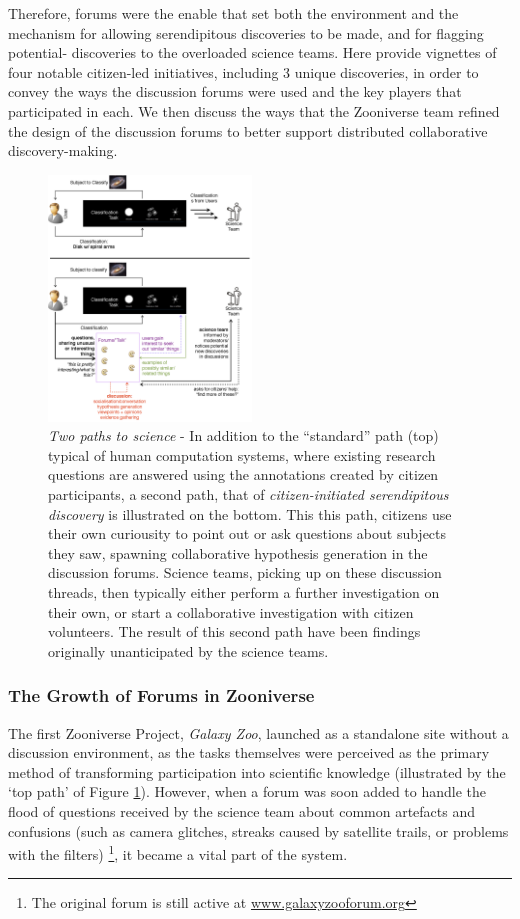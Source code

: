 \documentclass{sigchi}
\begin{document}
Therefore, forums were the enable that set both the environment and the mechanism for allowing serendipitous discoveries to be made, and for flagging potential- discoveries to the overloaded science teams. Here provide vignettes of four notable citizen-led initiatives, including 3 unique discoveries, in order to convey the ways the discussion forums were used and the key players that participated in each.  We then discuss the ways that the Zooniverse team refined the design of the discussion forums to better support distributed collaborative discovery-making.

\begin{figure}
\centering
\includegraphics[width=0.48\textwidth]{imgs/twopaths.png}
\caption{\emph{Two paths to science} - In addition to the ``standard'' path (top) typical of human computation systems, where existing research questions are answered using the annotations created by citizen participants, a second path, that of \emph{citizen-initiated serendipitous discovery} is illustrated on the bottom.  This this path, citizens use their own curiousity to point out or ask questions about subjects they saw, spawning collaborative hypothesis generation in the discussion forums. Science teams, picking up on these discussion threads, then typically either perform a further investigation on their own, or start a collaborative investigation with citizen volunteers.  The result of this second path have been findings originally unanticipated by the science teams.}
\label{fig:twopaths}
\end{figure}

\subsubsection{The Growth of Forums in Zooniverse}
The first Zooniverse Project, \emph{Galaxy Zoo}, launched as a standalone site without a discussion environment, as the tasks themselves were perceived as the primary method of transforming participation into scientific knowledge (illustrated by the `top path' of Figure \ref{fig:twopaths}). However, when a forum was soon added to handle the flood of questions received by the science team about common artefacts and confusions (such as camera glitches, streaks caused by satellite trails, or problems with the filters) \footnote{The original forum is still active at \url{www.galaxyzooforum.org}}, it became a vital part of the system.  
\end{document}
